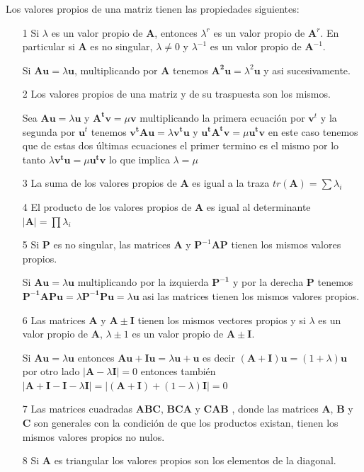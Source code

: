 \documentclass[12pt,letterpaper]{report} %
\begin{document}
Los valores propios de una matriz tienen las propiedades siguientes:
\begin{itemize}
\item[1] Si $\lambda$ es un valor propio de $\mathbf{A}$, entonces $\lambda^r$ es un valor propio de $\mathbf{A}^r$. En particular si $\mathbf{A}$ es no singular, $\lambda \ne 0$ y $\lambda^{-1}$ es un valor propio de $\mathbf{A}^{-1}$.

Si $\mathbf{Au}=\lambda\mathbf{u}$, multiplicando por $\mathbf{A}$ tenemos $\mathbf{A^2u}=\lambda^2\mathbf{u}$ y asi sucesivamente.

\item[2] Los valores propios de una matriz y de su traspuesta son los mismos.

Sea $\mathbf{Au}=\lambda \mathbf{u}$ y $\mathbf{A^t v}=\mu \mathbf{v}$ multiplicando la primera ecuación por $\mathbf{v}^t$ y la segunda por $\mathbf{u}^t$ tenemos $\mathbf{v^t A u}=\lambda \mathbf{v^tu}$ y $\mathbf{u^t A^t v}=\mu \mathbf{u^t v}$ en este caso tenemos que de estas dos últimas ecuaciones el primer termino es el mismo por lo tanto $\lambda \mathbf{v^tu}=\mu \mathbf{u^t v}$ lo que implica $\lambda=\mu$

\item[3] La suma de los valores propios de $\mathbf{A}$ es igual a la traza $tr(\mathbf{A})=\sum \lambda_{i}$

\item[4] El producto de los valores propios de $\mathbf{A}$ es igual al determinante $|\mathbf{A}|=\prod \lambda_{i}$

\item[5] Si $\mathbf{P}$ es no singular, las matrices $\mathbf{A}$ y $\mathbf{P}^{-1}\mathbf{A}\mathbf{P}$ tienen los mismos valores propios.

Si $\mathbf{Au}=\lambda \mathbf{u}$ multiplicando por la izquierda $\mathbf{P^{-1}}$ y por la derecha $\mathbf{P}$ tenemos $\mathbf{P^{-1}APu}=\lambda \mathbf{P^{-1}Pu}=\lambda \mathbf{u}$ asi las matrices tienen los mismos valores propios.

\item[6] Las matrices $\mathbf{A}$ y $\mathbf{A\pm I}$ tienen los mismos vectores propios y si $\lambda$ es un valor propio de $\mathbf{A}$, $\lambda \pm 1$ es un valor propio de $\mathbf{A\pm I}$.

Si $\mathbf{Au}=\lambda \mathbf{u}$ entonces $\mathbf{Au+ Iu}=\lambda \mathbf{u}+ \mathbf{u}$ es decir $(\mathbf{A+ I})\mathbf{u}=(1+\lambda) \mathbf{u}$ por otro lado $|\mathbf{A}-\lambda \mathbf{I}|=0$ entonces también $|\mathbf{A+I-I}-\lambda \mathbf{I}|=|(\mathbf{A+I})+(1-\lambda) \mathbf{I}|=0$

\item[7] Las matrices cuadradas $\mathbf{ABC}$, $\mathbf{BCA}$ y $\mathbf{CAB}$ , donde las matrices $\mathbf{A}$, $\mathbf{B}$ y $\mathbf{C}$ son generales con la condición de que los productos existan, tienen los mismos valores propios no nulos.

\item[8] Si $\mathbf{A}$ es triangular los valores propios son los elementos de la diagonal.
\end{itemize}
\end{document}
